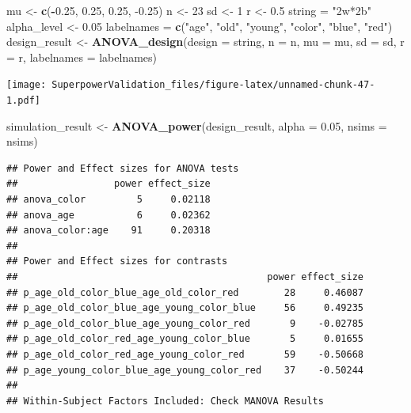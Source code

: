 \documentclass[]{book}
\newenvironment{Shaded}{\begin{snugshade}}{\end{snugshade}}
\newcommand{\DataTypeTok}[1]{\textcolor[rgb]{0.13,0.29,0.53}{#1}}
\newcommand{\DecValTok}[1]{\textcolor[rgb]{0.00,0.00,0.81}{#1}}
\newcommand{\FloatTok}[1]{\textcolor[rgb]{0.00,0.00,0.81}{#1}}
\newcommand{\KeywordTok}[1]{\textcolor[rgb]{0.13,0.29,0.53}{\textbf{#1}}}
\newcommand{\NormalTok}[1]{#1}
\newcommand{\OperatorTok}[1]{\textcolor[rgb]{0.81,0.36,0.00}{\textbf{#1}}}
\newcommand{\StringTok}[1]{\textcolor[rgb]{0.31,0.60,0.02}{#1}}
\begin{document}
\begin{Shaded}
\begin{Highlighting}[]
\NormalTok{mu <-}\StringTok{ }\KeywordTok{c}\NormalTok{(}\OperatorTok{-}\FloatTok{0.25}\NormalTok{, }\FloatTok{0.25}\NormalTok{, }\FloatTok{0.25}\NormalTok{, }\FloatTok{-0.25}\NormalTok{)}
\NormalTok{n <-}\StringTok{ }\DecValTok{23}
\NormalTok{sd <-}\StringTok{ }\DecValTok{1}
\NormalTok{r <-}\StringTok{ }\FloatTok{0.5}
\NormalTok{string =}\StringTok{ "2w*2b"}
\NormalTok{alpha_level <-}\StringTok{ }\FloatTok{0.05}
\NormalTok{labelnames =}\StringTok{ }\KeywordTok{c}\NormalTok{(}\StringTok{"age"}\NormalTok{, }\StringTok{"old"}\NormalTok{, }\StringTok{"young"}\NormalTok{, }\StringTok{"color"}\NormalTok{, }\StringTok{"blue"}\NormalTok{, }\StringTok{"red"}\NormalTok{)}
\NormalTok{design_result <-}\StringTok{ }\KeywordTok{ANOVA_design}\NormalTok{(}\DataTypeTok{design =}\NormalTok{ string,}
                              \DataTypeTok{n =}\NormalTok{ n, }
                              \DataTypeTok{mu =}\NormalTok{ mu, }
                              \DataTypeTok{sd =}\NormalTok{ sd, }
                              \DataTypeTok{r =}\NormalTok{ r, }
                              \DataTypeTok{labelnames =}\NormalTok{ labelnames)}
\end{Highlighting}
\end{Shaded}

\texttt{[image: SuperpowerValidation\_files/figure-latex/unnamed-chunk-47-1.pdf]}

\begin{Shaded}
\begin{Highlighting}[]
\NormalTok{simulation_result <-}\StringTok{ }\KeywordTok{ANOVA_power}\NormalTok{(design_result, }\DataTypeTok{alpha =} \FloatTok{0.05}\NormalTok{, }\DataTypeTok{nsims =}\NormalTok{ nsims)}
\end{Highlighting}
\end{Shaded}

\begin{verbatim}
## Power and Effect sizes for ANOVA tests
##                 power effect_size
## anova_color         5     0.02118
## anova_age           6     0.02362
## anova_color:age    91     0.20318
## 
## Power and Effect sizes for contrasts
##                                            power effect_size
## p_age_old_color_blue_age_old_color_red        28     0.46087
## p_age_old_color_blue_age_young_color_blue     56     0.49235
## p_age_old_color_blue_age_young_color_red       9    -0.02785
## p_age_old_color_red_age_young_color_blue       5     0.01655
## p_age_old_color_red_age_young_color_red       59    -0.50668
## p_age_young_color_blue_age_young_color_red    37    -0.50244
## 
## Within-Subject Factors Included: Check MANOVA Results
\end{verbatim}
\end{document}
